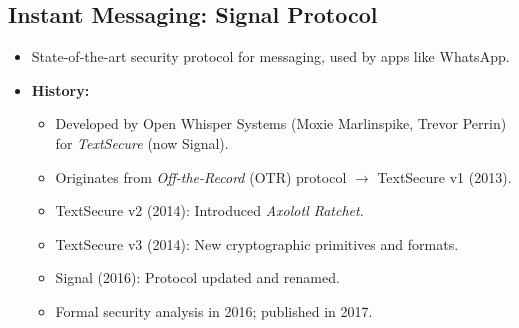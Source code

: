 \subsection{Instant Messaging: Signal Protocol}  
\begin{itemize}
    \item State-of-the-art security protocol for messaging, used by apps like WhatsApp.
    \item \textbf{History:}
    \begin{itemize}
        \item Developed by Open Whisper Systems (Moxie Marlinspike, Trevor Perrin) for \textit{TextSecure} (now Signal).
        \item Originates from \textit{Off-the-Record} (OTR) protocol $\rightarrow$ TextSecure v1 (2013).
        \item TextSecure v2 (2014): Introduced \textit{Axolotl Ratchet}.
        \item TextSecure v3 (2014): New cryptographic primitives and formats.
        \item Signal (2016): Protocol updated and renamed.
        \item Formal security analysis in 2016; published in 2017.
    \end{itemize}
\end{itemize}

